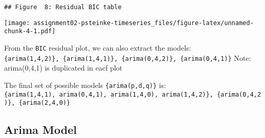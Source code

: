 \documentclass[]{article}
\newenvironment{Shaded}{\begin{snugshade}}{\end{snugshade}}
\newcommand{\DataTypeTok}[1]{\textcolor[rgb]{0.13,0.29,0.53}{#1}}
\newcommand{\DecValTok}[1]{\textcolor[rgb]{0.00,0.00,0.81}{#1}}
\newcommand{\KeywordTok}[1]{\textcolor[rgb]{0.13,0.29,0.53}{\textbf{#1}}}
\newcommand{\NormalTok}[1]{#1}
\newcommand{\OperatorTok}[1]{\textcolor[rgb]{0.81,0.36,0.00}{\textbf{#1}}}
\newcommand{\StringTok}[1]{\textcolor[rgb]{0.31,0.60,0.02}{#1}}
\begin{document}
\begin{Shaded}
\end{Shaded}

\begin{verbatim}
## Figure  8: Residual BIC table
\end{verbatim}

\begin{Shaded}
\end{Shaded}

\texttt{[image: assignment02-psteinke-timeseries\_files/figure-latex/unnamed-chunk-4-1.pdf]}

From the \texttt{BIC} residual plot, we can also extract the models:
\texttt{\{arima(1,4,2)\},\ \{arima(1,4,1)\},\ \{arima(0,4,2)\},\ \{arima(0,4,1)\}}
Note: arima(0,4,1) is duplicated in eacf plot

The final set of possible models \texttt{\{arima(p,d,q)\}} is:
\texttt{\{arima(1,4,1),\ arima(0,4,1),\ arima(1,4,0),\ arima(1,4,2)\},\ \{arima(0,4,2)\},\ \{arima(2,4,0)\}}

\hypertarget{arima-model}{%
\subsection{Arima Model}\label{arima-model}}
\end{document}
